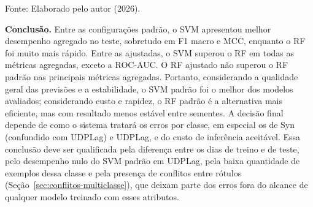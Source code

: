 \documentclass[
    12pt,                %
    openright,           %
    oneside,             %
    a4paper,             %
    english,             %
    brazil               %
]{abntex2}
\begin{document}
\begin{table}
\centering
\caption{Síntese da comparação entre os modelos multiclasse}
\label{tab:comparacao-multi-sintese}
\footnotesize
{}
\par\smallskip
Fonte: Elaborado pelo autor (2026).
\end{table}
 
\textbf{Conclusão.} Entre as configurações padrão, o SVM apresentou melhor desempenho agregado no teste, sobretudo em F1 macro e MCC, enquanto o RF foi muito mais rápido. Entre as ajustadas, o SVM superou o RF em todas as métricas agregadas, exceto a ROC-AUC. O RF ajustado não superou o RF padrão nas principais métricas agregadas. Portanto, considerando a qualidade geral das previsões e a estabilidade, o SVM padrão foi o melhor dos modelos avaliados; considerando custo e rapidez, o RF padrão é a alternativa mais eficiente, mas com resultado menos estável entre sementes. A decisão final depende de como o sistema tratará os erros por classe, em especial os de Syn (confundido com UDPLag) e UDPLag, e do custo de inferência aceitável. Essa conclusão deve ser qualificada pela diferença entre os dias de treino e de teste, pelo desempenho nulo do SVM padrão em UDPLag, pela baixa quantidade de exemplos dessa classe e pela presença de conflitos entre rótulos (Seção~\ref{sec:conflitos-multiclasse}), que deixam parte dos erros fora do alcance de qualquer modelo treinado com esses atributos.
\end{document}
